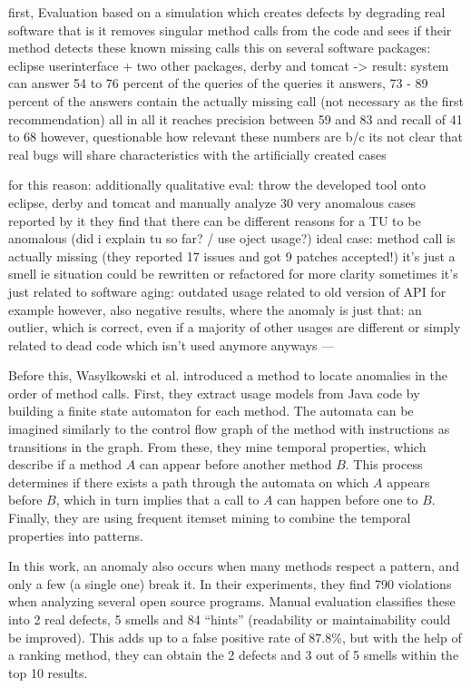 first, Evaluation based on a simulation which creates defects by degrading real software
that is it removes singular method calls from the code and sees if their method detects these known missing calls
this on several software packages: eclipse userinterface + two other packages, derby and tomcat
    -> result: system can answer 54 to 76 percent of the queries
    of the queries it answers, 73 - 89 percent of the answers contain the actually missing call (not necessary as the first recommendation)
    all in all it reaches precision between 59 and 83 and recall of 41 to 68
however, questionable how relevant these numbers are b/c its not clear that real bugs will share characteristics with the artificially created cases

for this reason:
additionally qualitative eval: throw the developed tool onto eclipse, derby and tomcat
and manually analyze 30 very anomalous cases reported by it
they find that there can be different reasons for a TU to be anomalous (did i explain tu so far? / use oject usage?)
ideal case: method call is actually missing (they reported 17 issues and got 9 patches accepted!)
it's just a smell ie situation could be rewritten or refactored for more clarity
sometimes it's just related to software aging: outdated usage related to old version of API for example
however, also negative results, where the anomaly is just that: an outlier, which is correct, even if a majority of other usages are different
or simply related to dead code which isn't used anymore anyways
---

Before this, Wasylkowski et al. \cite{wasylkowski2007detecting} introduced a method to locate anomalies in the order of method calls.
First, they extract usage models from Java code by building a finite state automaton for each method.
The automata can be imagined similarly to the control flow graph of the method with instructions as transitions in the graph.
From these, they mine temporal properties, which describe if a method $A$ can appear before another method $B$.
This process determines if there exists a path through the automata on which $A$ appears before $B$, which in turn implies that a call to $A$ can happen before one to $B$.
Finally, they are using frequent itemset mining \cite{han2006data} to combine the temporal properties into patterns.

In this work, an anomaly also occurs when many methods respect a pattern, and only a few (a single one) break it.
In their experiments, they find 790 violations when analyzing several open source programs.
Manual evaluation classifies these into 2 real defects, 5 smells and 84 ``hints'' (readability or maintainability could be improved).
This adds up to a false positive rate of 87.8\%, but with the help of a ranking method, they can obtain the 2 defects and 3 out of 5 smells within the top 10 results.

